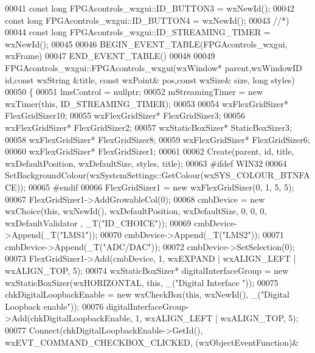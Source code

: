 \begin{DoxyCode}
00041 \textcolor{keyword}{const} \textcolor{keywordtype}{long} FPGAcontrols_wxgui::ID_BUTTON3 = wxNewId();
00042 \textcolor{keyword}{const} \textcolor{keywordtype}{long} FPGAcontrols_wxgui::ID_BUTTON4 = wxNewId();
00043 \textcolor{comment}{//*)}
00044 \textcolor{keyword}{const} \textcolor{keywordtype}{long} FPGAcontrols_wxgui::ID_STREAMING_TIMER = wxNewId();
00045 
00046 BEGIN\_EVENT\_TABLE(FPGAcontrols_wxgui, wxFrame)
00047 END\_EVENT\_TABLE()
00048 
00049 FPGAcontrols_wxgui::FPGAcontrols_wxgui(wxWindow* parent,wxWindowID \textcolor{keywordtype}{id},const wxString &title, const wxPoint&
       pos,const wxSize& size, \textcolor{keywordtype}{long} styles)
00050 \{
00051     lmsControl = \textcolor{keyword}{nullptr};
00052     mStreamingTimer = \textcolor{keyword}{new} wxTimer(\textcolor{keyword}{this}, ID\_STREAMING\_TIMER);
00053 
00054     wxFlexGridSizer* FlexGridSizer10;
00055     wxFlexGridSizer* FlexGridSizer3;
00056     wxFlexGridSizer* FlexGridSizer2;
00057     wxStaticBoxSizer* StaticBoxSizer3;
00058     wxFlexGridSizer* FlexGridSizer8;
00059     wxFlexGridSizer* FlexGridSizer6;
00060     wxFlexGridSizer* FlexGridSizer1;
00061 
00062     Create(parent, \textcolor{keywordtype}{id}, title, wxDefaultPosition, wxDefaultSize, styles, title);
00063 \textcolor{preprocessor}{#ifdef WIN32}
00064     SetBackgroundColour(wxSystemSettings::GetColour(wxSYS\_COLOUR\_BTNFACE));
00065 \textcolor{preprocessor}{#endif}
00066     FlexGridSizer1 = \textcolor{keyword}{new} wxFlexGridSizer(0, 1, 5, 5);
00067     FlexGridSizer1->AddGrowableCol(0);
00068     cmbDevice = \textcolor{keyword}{new} wxChoice(\textcolor{keyword}{this}, wxNewId(), wxDefaultPosition, wxDefaultSize, 0, 0, 0, wxDefaultValidator
      , _T(\textcolor{stringliteral}{"ID\_CHOICE"}));
00069     cmbDevice->Append(_T(\textcolor{stringliteral}{"LMS1"}));
00070     cmbDevice->Append(_T(\textcolor{stringliteral}{"LMS2"}));
00071     cmbDevice->Append(_T(\textcolor{stringliteral}{"ADC/DAC"}));
00072     cmbDevice->SetSelection(0);
00073     FlexGridSizer1->Add(cmbDevice, 1, wxEXPAND | wxALIGN\_LEFT | wxALIGN\_TOP, 5);
00074     wxStaticBoxSizer* digitalInterfaceGroup = \textcolor{keyword}{new} wxStaticBoxSizer(wxHORIZONTAL, \textcolor{keyword}{this}, \_(\textcolor{stringliteral}{"Digital Interface
      "}));
00075     chkDigitalLoopbackEnable = \textcolor{keyword}{new} wxCheckBox(\textcolor{keyword}{this}, wxNewId(), \_(\textcolor{stringliteral}{"Digital Loopback enable"}));
00076     digitalInterfaceGroup->Add(chkDigitalLoopbackEnable, 1, wxALIGN\_LEFT | wxALIGN\_TOP, 5);
00077     Connect(chkDigitalLoopbackEnable->GetId(), wxEVT\_COMMAND\_CHECKBOX\_CLICKED, (wxObjectEventFunction)&

\end{DoxyCode}

